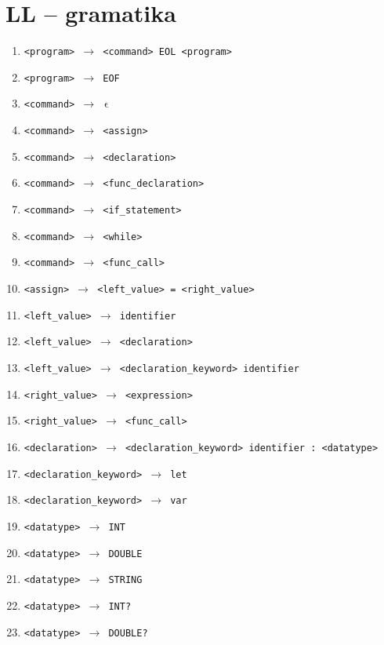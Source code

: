 \documentclass[a4paper, 11pt]{article}
\begin{document}
	\section*{LL -- gramatika}
	\label{sec:ll_grammar}
	{ \fontsize{10}{12}\selectfont 
	\begin{enumerate}[noitemsep]
		
		\item \texttt{<program> $\rightarrow$ <command> EOL <program>}
		\item \texttt{<program> $\rightarrow$ EOF}
		\item \texttt{<command> $\rightarrow\,\,\upvarepsilon$}
		\item \texttt{<command> $\rightarrow$ <assign>}
		\item \texttt{<command> $\rightarrow$ <declaration>}
		\item \texttt{<command> $\rightarrow$ <func\_declaration>}
		\item \texttt{<command> $\rightarrow$ <if\_statement>}
		\item \texttt{<command> $\rightarrow$ <while>}
		\item \texttt{<command> $\rightarrow$ <func\_call>}
		\item \texttt{<assign> $\rightarrow$ <left\_value> = <right\_value>}
		\item \texttt{<left\_value> $\rightarrow$ identifier}
		\item \texttt{<left\_value> $\rightarrow$ <declaration>}
		\item \texttt{<left\_value> $\rightarrow$ <declaration\_keyword> identifier}
		\item \texttt{<right\_value> $\rightarrow$ <expression>}
		\item \texttt{<right\_value> $\rightarrow$ <func\_call>}
		\item \texttt{<declaration> $\rightarrow$ <declaration\_keyword> identifier : <datatype>}
		\item \texttt{<declaration\_keyword> $\rightarrow$ let}
		\item \texttt{<declaration\_keyword> $\rightarrow$ var}
		\item \texttt{<datatype> $\rightarrow$ INT}
		\item \texttt{<datatype> $\rightarrow$ DOUBLE}
		\item \texttt{<datatype> $\rightarrow$ STRING}
		\item \texttt{<datatype> $\rightarrow$ INT?}
		\item \texttt{<datatype> $\rightarrow$ DOUBLE?}

\end{enumerate}}
\end{document}
